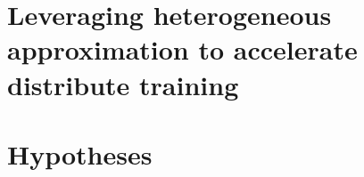 \section{Leveraging heterogeneous approximation to accelerate distribute training}
\section{Hypotheses}
